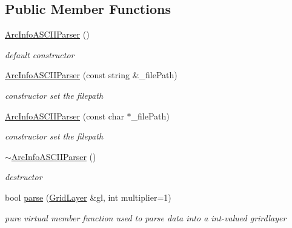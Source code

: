 \subsection*{\-Public \-Member \-Functions}
\begin{DoxyCompactItemize}
\item 
\hypertarget{classArcInfoASCIIParser_a16289b738375476ff81fb802a5c470ee}{\hyperlink{classArcInfoASCIIParser_a16289b738375476ff81fb802a5c470ee}{\-Arc\-Info\-A\-S\-C\-I\-I\-Parser} ()}\label{classArcInfoASCIIParser_a16289b738375476ff81fb802a5c470ee}

\begin{DoxyCompactList}\small\item\em default constructor \end{DoxyCompactList}\item 
\hypertarget{classArcInfoASCIIParser_ae7ff0d38d9c1603fbecc49749dd4d31b}{\hyperlink{classArcInfoASCIIParser_ae7ff0d38d9c1603fbecc49749dd4d31b}{\-Arc\-Info\-A\-S\-C\-I\-I\-Parser} (const string \&\-\_\-file\-Path)}\label{classArcInfoASCIIParser_ae7ff0d38d9c1603fbecc49749dd4d31b}

\begin{DoxyCompactList}\small\item\em constructor set the filepath \end{DoxyCompactList}\item 
\hypertarget{classArcInfoASCIIParser_abe97d197a44d14edae52546d48079e1d}{\hyperlink{classArcInfoASCIIParser_abe97d197a44d14edae52546d48079e1d}{\-Arc\-Info\-A\-S\-C\-I\-I\-Parser} (const char $\ast$\-\_\-file\-Path)}\label{classArcInfoASCIIParser_abe97d197a44d14edae52546d48079e1d}

\begin{DoxyCompactList}\small\item\em constructor set the filepath \end{DoxyCompactList}\item 
\hypertarget{classArcInfoASCIIParser_a0f12fe096ddf4d7fe1ab4f3287a74b8b}{\hyperlink{classArcInfoASCIIParser_a0f12fe096ddf4d7fe1ab4f3287a74b8b}{$\sim$\-Arc\-Info\-A\-S\-C\-I\-I\-Parser} ()}\label{classArcInfoASCIIParser_a0f12fe096ddf4d7fe1ab4f3287a74b8b}

\begin{DoxyCompactList}\small\item\em destructor \end{DoxyCompactList}\item 
bool \hyperlink{classArcInfoASCIIParser_a1f63530762118826b85565479c98502a}{parse} (\hyperlink{classGridLayer}{\-Grid\-Layer} \&gl, int multiplier=1)
\begin{DoxyCompactList}\small\item\em pure virtual member function used to parse data into a int-\/valued grirdlayer \end{DoxyCompactList}\end{DoxyCompactItemize}


